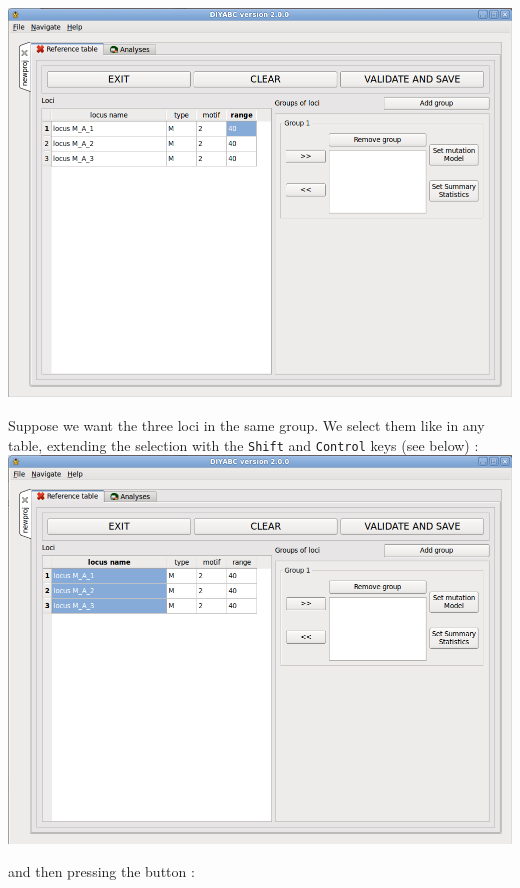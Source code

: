 \includegraphics[scale=0.35]{gui_pictures/Capture-DIYABC-16.png} 

Suppose we want the three loci in the same group. We select them like in any table, extending the selection with the \texttt{Shift} and \texttt{Control} keys (see below) : \\

\includegraphics[scale=0.35]{gui_pictures/Capture-DIYABC-17.png} 

and then pressing the \fbox{\textsf{$ >> $}} button : \\

